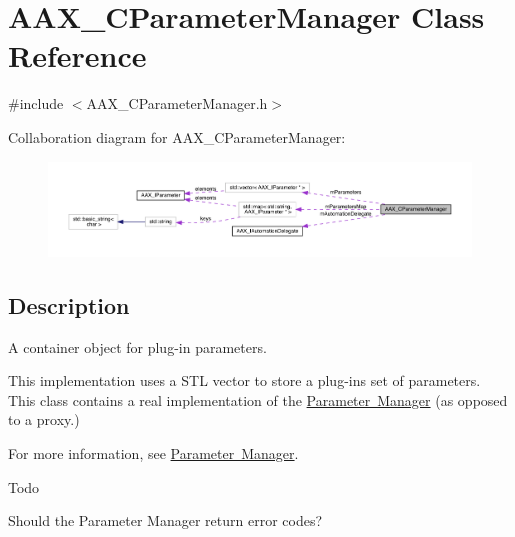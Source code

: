 \hypertarget{a01545}{}\section{A\+A\+X\+\_\+\+C\+Parameter\+Manager Class Reference}
\label{a01545}


{\ttfamily \#include $<$A\+A\+X\+\_\+\+C\+Parameter\+Manager.\+h$>$}



Collaboration diagram for A\+A\+X\+\_\+\+C\+Parameter\+Manager\+:
\nopagebreak
\begin{figure}[H]
\begin{center}
\leavevmode
\includegraphics[width=350pt]{a01543}
\end{center}
\end{figure}


\subsection{Description}
A container object for plug-\/in parameters. 

This implementation uses a S\+TL vector to store a plug-\/in\textquotesingle{}s set of parameters. This class contains a real implementation of the \mbox{\hyperlink{a00814}{Parameter Manager}} (as opposed to a proxy.)

For more information, see \mbox{\hyperlink{a00814}{Parameter Manager}}.

\begin{DoxyRefDesc}{Todo}
\item[\mbox{\hyperlink{a00785__todo000018}{Todo}}]Should the Parameter Manager return error codes?\end{DoxyRefDesc}
